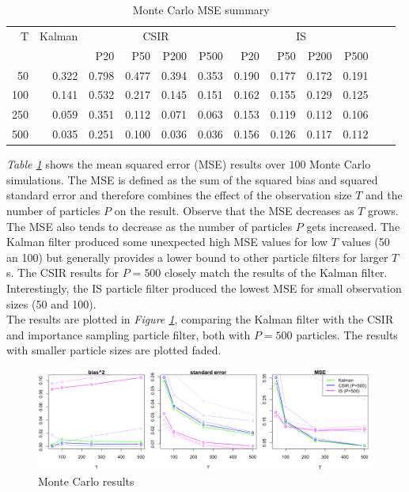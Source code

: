 \documentclass[11pt, oneside]{scrreprt}   	%
\begin{document}
\begin{table}[h!]
\centering
\begin{tabular}{rrrrrrrrrrrr}
\hline
T  & Kalman &  \multicolumn{4}{c}{CSIR} &  \multicolumn{4}{c}{IS}\\
\cline{3-10}
& & P20 & P50 & P200 & P500 & P20 & P50 & P200 & P500\\
\hline
50        & 0.322 & 0.798 & 0.477 & 0.394 & 0.353 & 0.190 & 0.177 & 0.172 & 0.191\\
100      & 0.141 & 0.532 & 0.217 & 0.145 & 0.151 & 0.162 & 0.155 & 0.129 & 0.125\\
250      & 0.059 & 0.351 & 0.112 & 0.071 & 0.063 & 0.153 & 0.119 & 0.112 & 0.106\\
500      & 0.035 & 0.251 & 0.100 & 0.036 & 0.036 & 0.156 & 0.126 & 0.117 & 0.112\\
\hline
\end{tabular}
\caption{Monte Carlo MSE summary}
\label{tab:param_inference_mse}
\end{table}

\textit{Table \ref{tab:param_inference_mse}} shows the mean squared error (MSE) results over $100$ Monte Carlo simulations. The MSE is defined as the sum of the squared bias and squared standard error and therefore combines the effect of the observation size $T$ and the number of particles $P$ on the result. Observe that the MSE decreases as $T$ grows. The MSE also tends to decrease as the number of particles $P$ gets increased. The Kalman filter produced some unexpected high MSE values for low $T$ values (50 an 100) but generally provides a lower bound to other particle filters for larger $T$s. The CSIR results for $P=500$ closely match the results of the Kalman filter. Interestingly, the IS particle filter produced the lowest MSE for small observation sizes (50 and 100).\\

The results are plotted in \textit{Figure \ref{fig:ullm-mc-mle}}, comparing the Kalman filter with the CSIR and importance sampling particle filter, both with $P=500$ particles. The results with smaller particle sizes are plotted faded.

\begin{figure}[h!]
\centering
\includegraphics[width=155mm]{../../images/ullm-mc-mle.png}
\caption{Monte Carlo results}
\label{fig:ullm-mc-mle}
\end{figure}
\end{document}

